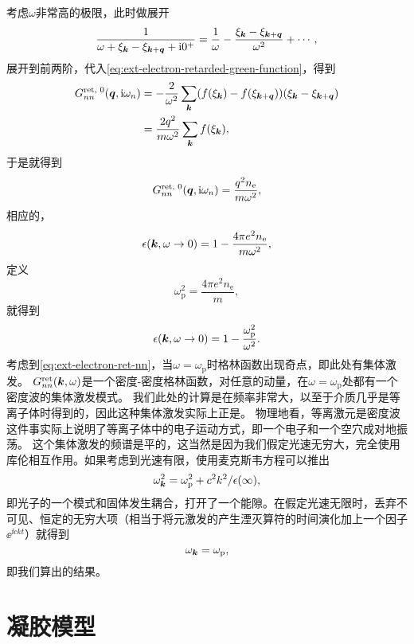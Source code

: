 考虑$\omega$非常高的极限，此时做展开
\[
    \frac{1}{\omega + \xi_{\vb*{k}} - \xi_{\vb*{k} + \vb*{q}} + \mathrm{i} 0^+} = \frac{1}{\omega} - \frac{\xi_{\vb*{k}} - \xi_{\vb*{k} + \vb*{q}}}{\omega^2} + \cdots,
\]
展开到前两阶，代入\eqref{eq:ext-electron-retarded-green-function}，得到
\[
    \begin{aligned}
        G_{nn}^\text{ret, 0}(\vb*{q}, \mathrm{i} \omega_n) &= - \frac{2}{\omega^2} \sum_{\vb*{k}} (f(\xi_{\vb*{k}}) - f(\xi_{\vb*{k} + \vb*{q}})) (\xi_{\vb*{k}} - \xi_{\vb*{k} + \vb*{q}}) \\
        &= \frac{2 q^2}{m \omega^2} \sum_{\vb*{k}} f(\xi_{\vb*{k}}), 
    \end{aligned}
\]
于是就得到
\begin{equation}
    G_{nn}^\text{ret, 0}(\vb*{q}, \mathrm{i} \omega_n) = \frac{q^2 n_\text{e}}{m \omega^2},
\end{equation}
相应的，
\[
    \epsilon(\vb*{k}, \omega \to 0) = 1 - \frac{4 \pi e^2 n_\text{e}}{m \omega^2},
\]
定义
\begin{equation}
    \omega_\text{p}^2 = \frac{4 \pi e^2 n_\text{e}}{m},
\end{equation}
就得到
\begin{equation}
    \epsilon(\vb*{k}, \omega \to 0) = 1 - \frac{\omega_\text{p}^2}{\omega^2}.
\end{equation}
考虑到\eqref{eq:ext-electron-ret-nn}，当$\omega = \omega_\text{p}$时格林函数出现奇点，即此处有集体激发。
$G^\text{ret}_{nn}(\vb*{k}, \omega)$是一个密度-密度格林函数，对任意的动量，在$\omega = \omega_\text{p}$处都有一个密度波的集体激发模式。
我们此处的计算是在频率非常大，以至于介质几乎是等离子体时得到的，因此这种集体激发实际上正是。
物理地看，等离激元是密度波这件事实际上说明了等离子体中的电子运动方式，即一个电子和一个空穴成对地振荡。
这个集体激发的频谱是平的，这当然是因为我们假定光速无穷大，完全使用库伦相互作用。如果考虑到光速有限，使用麦克斯韦方程可以推出
\begin{equation}
    \omega_{\vb*{k}}^2 = \omega_\text{p}^2 + c^2 k^2 / \epsilon(\infty),
\end{equation}
即光子的一个模式和固体发生耦合，打开了一个能隙。在假定光速无限时，丢弃不可见、恒定的无穷大项（相当于将元激发的产生湮灭算符的时间演化加上一个因子$\ee^{\ii c k t}$）就得到
\[
    \omega_{\vb*{k}} = \omega_\text{p},
\]
即我们算出的结果。

\section{凝胶模型}

